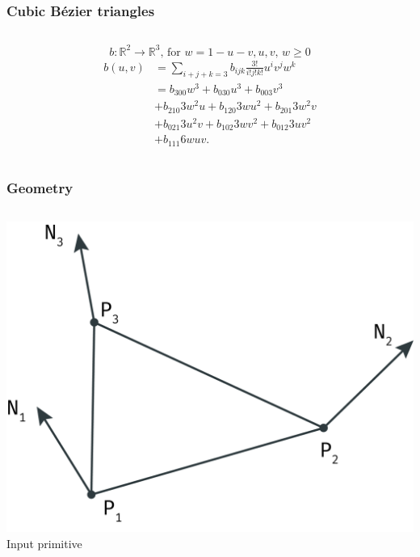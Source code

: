 	\begin{frame}\frametitle{Cubic B\'ezier triangles}
		\begin{columns}
			\begin{column}{\textwidth}
				\begin{equation*}
					b: \mathbb{R}^2 \rightarrow \mathbb{R}^3 \text{, for } w = 1 - u - v, u, v \text{, } w \geq 0
				\end{equation*}
				\begin{equation*}
					\begin{aligned}
						b(u,v) & = \sum\limits_{i+j+k=3} b_{ijk} \frac{3!}{i!j!k!} u^i v^j w^k\\
						& = b_{300} w^3 + b_{030} u^3 + b_{003} v^3 \\
						& + b_{210} 3 w^2 u + b_{120} 3 w u^2 + b_{201} 3 w^2 v\\
						& + b_{021} 3 u^2 v + b_{102} 3 w v^2 + b_{012} 3 u v^2\\
						& + b_{111} 6 w u v.
 					\end{aligned}
				\end{equation*}
			\end{column}
		\end{columns}
	\end{frame}

	\begin{frame}\frametitle{Geometry}
		\begin{columns}
			\begin{column}{0.6\textwidth}
				\begin{center}
					\includegraphics[width=\textwidth]{img/1_single/inputPrimitive.png}
					\small{Input primitive}
				\end{center}
			\end{column}
		\end{columns}
	\end{frame}

